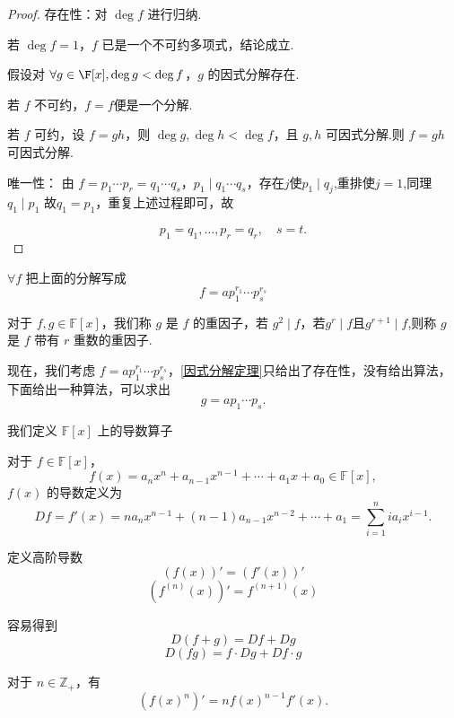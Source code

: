 \begin{proof}
	存在性：对 \( \deg f \) 进行归纳.
	
	若 \( \deg f = 1 \)，\( f \) 已是一个不可约多项式，结论成立.
	
	假设对 \(\forall g\in\F[x] ,\deg g < \deg f \)，\( g \) 的因式分解存在.
	
	若 \( f \) 不可约，\(f=f\)便是一个分解.
	
	若 \( f \) 可约，设 \( f = gh \)，则 \( \deg g, \deg h < \deg f \)，且 \( g, h \) 可因式分解.则 \( f = gh \) 可因式分解.
	
	唯一性： 由 \( f = p_1 \cdots p_r = q_1 \cdots q_s \)，\( p_1 \mid q_1 \cdots q_s \)，存在$j$使$p_1\mid q_j$,重排使\(j=1\),同理\(q_1\mid p_1\) 故\( q_1 = p_1 \)，重复上述过程即可，故
	
	\[ p_1 = q_1, \ldots, p_r = q_r, \quad s = t. \]
	
	
	
\end{proof}
$\forall f$ 把上面的分解写成
\[f=ap_{1}^{r_1}\cdots p_{s}^{r_s}\]
\begin{definition}
	对于 \( f, g \in \mathbb{F}[x] \)，我们称 \( g \) 是 \( f \) 的重因子，若 \( g^2 \mid f \)，若\( g^r \mid f \)且\( g^{r+1} \mid f \),则称 \( g \) 是 \( f \) 带有 \( r \) 重数的重因子.
\end{definition}

现在，我们考虑 \( f = a p_1^{r_1} \cdots p_s^{r_s} \)，\ref{因式分解定理}只给出了存在性，没有给出算法，下面给出一种算法，可以求出
\[ g = a p_1 \cdots p_s. \]



我们定义 \( \mathbb{F}[x] \) 上的导数算子
\begin{definition}
	对于 \( f \in \mathbb{F}[x] \)，
	\[ f(x) = a_n x^n + a_{n-1} x^{n-1} + \cdots + a_1 x + a_0 \in \mathbb{F}[x], \]
	\( f(x) \) 的导数定义为
	\[ Df = f'(x) = n a_n x^{n-1} + (n-1) a_{n-1} x^{n-2} + \cdots + a_1 = \sum_{i=1}^n i a_i x^{i-1}. \]
	
	定义高阶导数\[ (f(x))' = (f'(x))' \]
	\[ (f^{(n)}(x))' = f^{(n+1)}(x) \]
\end{definition}
容易得到
\[ D(f + g) = Df + Dg \]
\[ D(fg) = f \cdot Dg + Df \cdot g \]

对于 \( n \in \mathbb{Z}_+ \)，有
\[ (f(x)^n)' = n f(x)^{n-1} f'(x). \]


